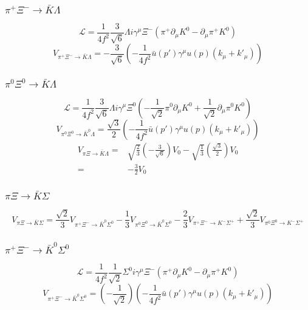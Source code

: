 \subsubsection{$\pi^{+}\Xi^{-}\to \bar{K}\Lambda$}
\begin{equation}
	\mathcal{L}=\frac{1}{4f^2}\frac{3}{\sqrt{6}}\Lambda i\gamma^{\mu}\Xi^{-}(\pi^{+}\partial_{\mu}K^{0}-\partial_{\mu}\pi^{+}K^{0})
\end{equation}
\begin{equation}
V_{\pi^{+}\Xi^{-}\to \bar{K}\Lambda}=-\frac{3}{\sqrt{6}}\left(-\frac{1}{4f^2}\bar{u}(p')\gamma^{\mu}u(p)(k_{\mu}+k'_{\mu})\right)
\end{equation}
\subsubsection{$\pi^{0}\Xi^{0}\to \bar{K}\Lambda$}
\begin{equation}
	\mathcal{L}=\frac{1}{4f^2}\frac{3}{\sqrt{6}}\Lambda i\gamma^{\mu}\Xi^{0}(-\frac{1}{\sqrt{2}}\pi^{0}\partial_{\mu}K^{0}+\frac{1}{\sqrt{2}}\partial_{\mu}\pi^{0}K^{0})
\end{equation}
\begin{equation}
	V_{\pi^{0}\Xi^{0}\rightarrow \bar{K}^{0}\Lambda}=\frac{\sqrt{3}}{2}\left(-\frac{1}{4f^2}\bar{u}(p')\gamma^{\mu}u(p)(k_{\mu}+k'_{\mu})\right)
\end{equation}
\begin{equation}
\begin{split}
	V_{\pi\Xi\rightarrow \bar{K}\Lambda}=&\sqrt{\frac{2}{3}}(-\frac{3}{\sqrt{6}})V_{0}-\sqrt{\frac{1}{3}}(\frac{\sqrt{3}}{2})V_{0}\\
	=&-\frac{3}{2}V_{0}
\end{split}
\end{equation}
\subsubsection{$\pi\Xi\rightarrow \bar{K}\Sigma$}
\begin{equation}
	V_{\pi\Xi\rightarrow \bar{K}\Sigma}=\frac{\sqrt{2}}{3}V_{\pi^{+}\Xi^{-}\rightarrow \bar{K}^{0}\Sigma^{0}}-\frac{1}{3}V_{\pi^{0}\Xi^{0}\rightarrow \bar{K}^{0}\Sigma^{0}}-\frac{2}{3}V_{\pi^{+}\Xi^{-}\rightarrow K^{-}\Sigma^{+}}+\frac{\sqrt{2}}{3}V_{\pi^{0}\Xi^{0}\rightarrow K^{-}\Sigma^{+}}
\end{equation}
\subsubsection{$\pi^{+}\Xi^{-}\to \bar{K}^{0}\Sigma^{0}$}
\begin{equation}
	\mathcal{L}=\frac{1}{4f^2}\frac{1}{\sqrt{2}}\Sigma^{0}i\gamma^{\mu}\Xi^{-}(\pi^{+}\partial_{\mu}K^{0}-\partial_{\mu}\pi^{+}K^{0})
\end{equation}
\begin{equation}
	V_{\pi^{+}\Xi^{-}\rightarrow \bar{K}^{0}\Sigma^{0}}=\left(-\frac{1}{\sqrt{2}}\right)\left(-\frac{1}{4f^2}\bar{u}(p')\gamma^{\mu}u(p)(k_{\mu}+k'_{\mu})\right)
\end{equation}
